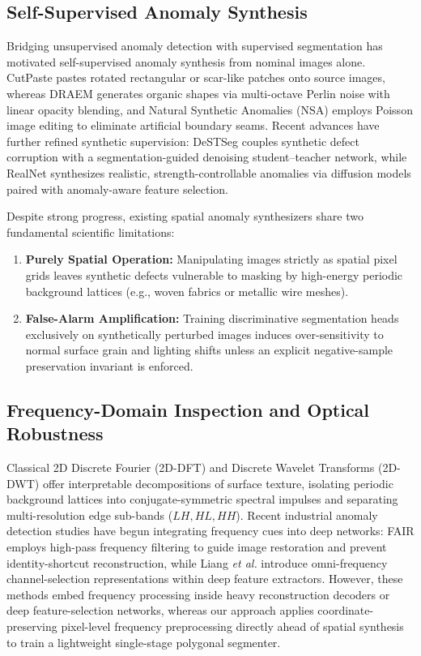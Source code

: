 \subsection{Self-Supervised Anomaly Synthesis}
Bridging unsupervised anomaly detection with supervised segmentation has motivated self-supervised anomaly synthesis from nominal images alone. CutPaste \cite{li2021cutpaste} pastes rotated rectangular or scar-like patches onto source images, whereas DRAEM \cite{zavrtanik2021draem} generates organic shapes via multi-octave Perlin noise \cite{perlin1985image} with linear opacity blending, and Natural Synthetic Anomalies (NSA) \cite{schluter2022natural} employs Poisson image editing \cite{perez2003poisson} to eliminate artificial boundary seams. Recent advances have further refined synthetic supervision: DeSTSeg \cite{zhang2023destseg} couples synthetic defect corruption with a segmentation-guided denoising student--teacher network, while RealNet \cite{zhang2024realnet} synthesizes realistic, strength-controllable anomalies via diffusion models paired with anomaly-aware feature selection.

Despite strong progress, existing spatial anomaly synthesizers share two fundamental scientific limitations:
\begin{enumerate}
    \item \textbf{Purely Spatial Operation:} Manipulating images strictly as spatial pixel grids leaves synthetic defects vulnerable to masking by high-energy periodic background lattices (e.g., woven fabrics or metallic wire meshes).
    \item \textbf{False-Alarm Amplification:} Training discriminative segmentation heads exclusively on synthetically perturbed images induces over-sensitivity to normal surface grain and lighting shifts unless an explicit negative-sample preservation invariant is enforced.
\end{enumerate}

\subsection{Frequency-Domain Inspection and Optical Robustness}
Classical 2D Discrete Fourier (2D-DFT) and Discrete Wavelet Transforms (2D-DWT) \cite{gonzalez2018digital, mallat2008wavelet} offer interpretable decompositions of surface texture, isolating periodic background lattices into conjugate-symmetric spectral impulses and separating multi-resolution edge sub-bands ($LH, HL, HH$). Recent industrial anomaly detection studies have begun integrating frequency cues into deep networks: FAIR \cite{liu2025fair} employs high-pass frequency filtering to guide image restoration and prevent identity-shortcut reconstruction, while Liang \textit{et al.} \cite{liang2023omnifrequency} introduce omni-frequency channel-selection representations within deep feature extractors. However, these methods embed frequency processing inside heavy reconstruction decoders or deep feature-selection networks, whereas our approach applies coordinate-preserving pixel-level frequency preprocessing directly ahead of spatial synthesis to train a lightweight single-stage polygonal segmenter.

